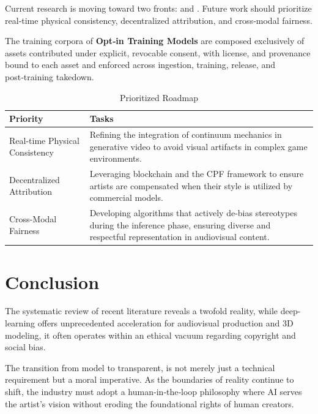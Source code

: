 \documentclass[9pt,a4paper,twocolumn,twoside]{rho-class/rho}
\begin{document}
    Current research is moving toward two fronts:  and . Future work should prioritize real‑time physical consistency, decentralized attribution, and cross‑modal fairness. 

        \begin{note}
            The training corpora of \textbf{Opt‑in Training Models} are composed exclusively of assets contributed under explicit, revocable consent, with license, and provenance bound to each asset and enforced across ingestion, training, release, and post‑training takedown.
        \end{note}

        \begin{table}[H]
        	\caption{Prioritized Roadmap}
        	\label{tab:table}
        	\begin{tabular}{
        		>{\raggedright\arraybackslash}p{}
        		>{\raggedright\arraybackslash}p{}
        	}
        	\toprule
        	\textbf{Priority} & \textbf{Tasks} \\
        	\midrule
        	Real-time Physical Consistency & Refining the integration of continuum mechanics in generative video to avoid visual artifacts in complex game environments. \\
        	Decentralized Attribution & Leveraging blockchain and the CPF framework to ensure artists are compensated when their style is utilized by commercial models. \\
        	Cross-Modal Fairness & Developing algorithms that actively de-bias stereotypes during the inference phase, ensuring diverse and respectful representation in audiovisual content. \\
        	\bottomrule
        	\end{tabular}
        \end{table}

\section{Conclusion}

        The systematic review of recent literature reveals a twofold reality, while deep-learning offers unprecedented acceleration for audiovisual production and 3D modeling, it often operates within an ethical vacuum regarding copyright and social bias. 
        
        The transition from  model to transparent,  is not merely just a technical requirement but a moral imperative. As the boundaries of reality continue to shift, the industry must adopt a human‑in‑the‑loop philosophy where AI serves the artist's vision without eroding the foundational rights of human creators.


\printbibliography

\end{document}
